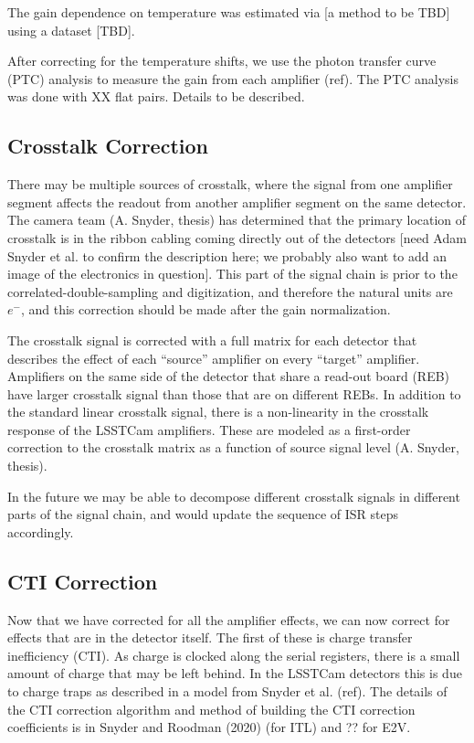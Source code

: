 \documentclass[SE,authoryear,lsstdraft,toc]{lsstdoc}
\newcommand{\etron}{e^{-}}
\begin{document}
The gain dependence on temperature was estimated via [a method to be TBD] using
a dataset [TBD].

After correcting for the temperature shifts, we use the photon transfer curve
(PTC) analysis to measure the gain from each amplifier (ref).  The PTC analysis was
done with XX flat pairs.  Details to be described.

\subsection{Crosstalk Correction}
\label{sec:xtalk}

There may be multiple sources of crosstalk, where the signal from one amplifier
segment affects the readout from another amplifier segment on the same
detector. The camera team (A. Snyder, thesis) has determined that the primary
location of crosstalk is in the ribbon cabling coming directly out of the
detectors [need Adam Snyder et al. to confirm the description here; we probably
  also want to add an image of the electronics in question]. This part of the
signal chain is prior to the correlated-double-sampling and digitization, and
therefore the natural units are $\etron$, and this correction should be made
after the gain normalization.

The crosstalk signal is corrected with a full matrix for each detector that
describes the effect of each ``source'' amplifier on every ``target''
amplifier. Amplifiers on the same side of the detector that share a read-out
board (REB) have larger crosstalk signal than those that are on different
REBs. In addition to the standard linear crosstalk signal, there is a
non-linearity in the crosstalk response of the LSSTCam amplifiers.  These are
modeled as a first-order correction to the crosstalk matrix as a function of
source signal level (A. Snyder, thesis).

In the future we may be able to decompose different crosstalk signals in
different parts of the signal chain, and would update the sequence of ISR steps
accordingly.

\subsection{CTI Correction}
\label{sec:cti}

Now that we have corrected for all the amplifier effects, we can now correct
for effects that are in the detector itself.  The first of these is charge
transfer inefficiency (CTI).  As charge is clocked along the serial registers,
there is a small amount of charge that may be left behind.  In the LSSTCam
detectors this is due to charge traps as described in a model from Snyder et
al.  (ref).  The details of the CTI correction algorithm and method of building
the CTI correction coefficients is in Snyder and Roodman (2020) (for ITL) and
?? for E2V.
\end{document}
